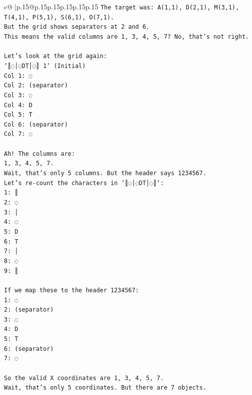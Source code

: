 \documentclass{article}
\begin{document}
{\begin{supertabular}{c@{$\;$}|p{.15\linewidth}@{}p{.15\linewidth}p{.15\linewidth}p{.15\linewidth}p{.15\linewidth}p{.15\linewidth}}
{{{\texttt{The target was: A(1,1), D(2,1), M(3,1), T(4,1), P(5,1), S(6,1), O(7,1).} \\
\texttt{But the grid shows separators at 2 and 6.} \\
\texttt{This means the valid columns are 1, 3, 4, 5, 7? No, that's not right.} \\
\\ 
\texttt{Let's look at the grid again:} \\
\texttt{`║◌│◌DT│◌║ 1` (Initial)} \\
\texttt{Col 1: ◌} \\
\texttt{Col 2: (separator)} \\
\texttt{Col 3: ◌} \\
\texttt{Col 4: D} \\
\texttt{Col 5: T} \\
\texttt{Col 6: (separator)} \\
\texttt{Col 7: ◌} \\
\\ 
\texttt{Ah! The columns are:} \\
\texttt{1, 3, 4, 5, 7.} \\
\texttt{Wait, that's only 5 columns. But the header says 1234567.} \\
\texttt{Let's re{-}count the characters in `║◌│◌DT│◌║`:} \\
\texttt{1: ║} \\
\texttt{2: ◌} \\
\texttt{3: │} \\
\texttt{4: ◌} \\
\texttt{5: D} \\
\texttt{6: T} \\
\texttt{7: │} \\
\texttt{8: ◌} \\
\texttt{9: ║} \\
\\ 
\texttt{If we map these to the header 1234567:} \\
\texttt{1: ◌} \\
\texttt{2: (separator)} \\
\texttt{3: ◌} \\
\texttt{4: D} \\
\texttt{5: T} \\
\texttt{6: (separator)} \\
\texttt{7: ◌} \\
\\ 
\texttt{So the valid X coordinates are 1, 3, 4, 5, 7.} \\
\texttt{Wait, that's only 5 coordinates. But there are 7 objects.} \\
}}}
\end{supertabular}}
\end{document}
